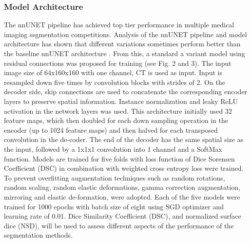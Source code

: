 \documentclass[runningheads]{llncs}
\begin{document}
\subsubsection{Model Architecture} The nnUNET pipeline has achieved top tier performance in multiple medical imaging segmentation competitions. Analysis of the nnUNET pipeline and model architecture has shown that different variations sometimes perform better than the baseline nnUNET architecture \cite{murugesan2021head} \cite{Isensee}. From this, a standard a variant model using residual connections was proposed for training (see Fig. 2 and 3). The input image size of 64x160x160 with one channel, CT is used as input. Input is resampled down five times by convolution blocks with strides of 2. On the decoder side, skip connections are used to concatenate the corresponding encoder layers to preserve spatial information. Instance normalization and leaky ReLU activation in the network layers was used. This architecture initially used 32 feature maps, which then doubled for each down sampling operation in the encoder (up to 1024 feature maps) and then halved for each transposed convolution in the de-coder. The end of the decoder has the same spatial size as the input, followed by a 1x1x1 convolution into 1 channel and a SoftMax function. Models are trained for five folds with loss function of Dice Sorensen Coefficient (DSC) in combination with weighted cross entropy loss were trained.  To prevent overfitting augmentation techniques such as random rotations, random scaling, random elastic deformations, gamma correction augmentation, mirroring and elastic de-formation, were adopted. Each of the five models were trained for 1000 epochs with batch size of eight using SGD optimizer and learning rate of 0.01. Dice Similarity Coefficient (DSC), and normalized surface dice (NSD), will be used to assess different aspects of the performance of the segmentation methods.
\end{document}
